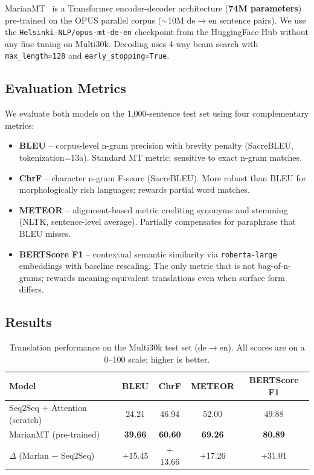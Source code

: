 \documentclass[11pt,a4paper]{article}
\begin{document}
MarianMT~\cite{junczys2018marian} is a Transformer encoder-decoder
architecture (\textbf{74M parameters}) pre-trained on the OPUS parallel
corpus ($\sim$10M de$\rightarrow$en sentence pairs). We use the
\texttt{Helsinki-NLP/opus-mt-de-en} checkpoint from the HuggingFace Hub
without any fine-tuning on Multi30k. Decoding uses 4-way beam search with
\texttt{max\_length=128} and \texttt{early\_stopping=True}.

\subsection{Evaluation Metrics}

We evaluate both models on the 1{,}000-sentence test set using four
complementary metrics:
\begin{itemize}[noitemsep]
    \item \textbf{BLEU} -- corpus-level n-gram precision with brevity
    penalty (SacreBLEU, tokenization=13a). Standard MT metric; sensitive
    to exact n-gram matches.
    \item \textbf{ChrF} -- character n-gram F-score (SacreBLEU). More
    robust than BLEU for morphologically rich languages; rewards partial
    word matches.
    \item \textbf{METEOR} -- alignment-based metric crediting synonyms and
    stemming (NLTK, sentence-level average). Partially compensates for
    paraphrase that BLEU misses.
    \item \textbf{BERTScore F1} -- contextual semantic similarity via
    \texttt{roberta-large} embeddings with baseline rescaling. The only
    metric that is not bag-of-n-grams; rewards meaning-equivalent
    translations even when surface form differs.
\end{itemize}

\subsection{Results}

\begin{table}[H]
\centering
\caption{Translation performance on the Multi30k test set (de$\rightarrow$en).
All scores are on a 0--100 scale; higher is better.}
\label{tab:q4-results}
\begin{tabular}{lcccc}
\toprule
\textbf{Model} & \textbf{BLEU} & \textbf{ChrF} & \textbf{METEOR}
               & \textbf{BERTScore F1} \\
\midrule
Seq2Seq + Attention (scratch) & 24.21 & 46.94 & 52.00 & 49.88 \\
MarianMT (pre-trained)        & \textbf{39.66} & \textbf{60.60}
                               & \textbf{69.26} & \textbf{80.89} \\
\midrule
$\Delta$ (Marian $-$ Seq2Seq) & $+$15.45 & $+$13.66 & $+$17.26 & $+$31.01 \\
\bottomrule
\end{tabular}
\end{table}
\end{document}
